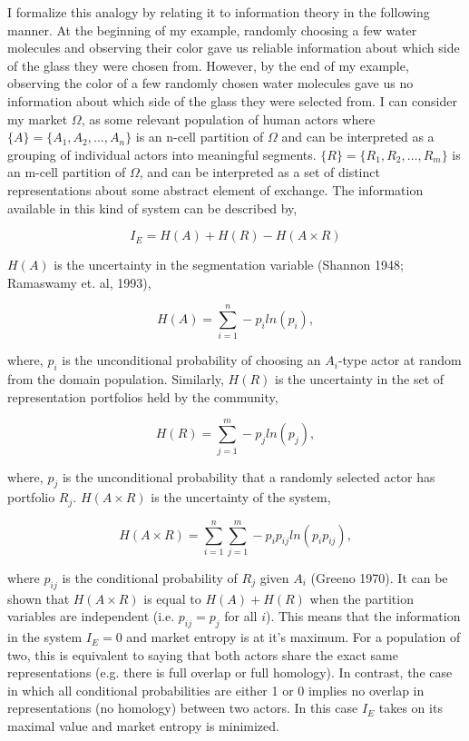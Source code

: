 I formalize this analogy by relating it to information theory in the following manner. At the beginning of my example, randomly choosing a few water molecules and observing their color gave us reliable information about which side of the glass they were chosen from. However, by the end of my example, observing the color of a few randomly chosen water molecules gave us no information about which side of the glass they were selected from.  I can consider my market $\Omega$, as some relevant population of human actors where $\{A\} = \{A_1, A_2,\ldots,A_n\}$ is an n-cell partition of $\Omega$ and can be interpreted as a grouping of individual actors into meaningful segments. $\{R\} = \{R_1, R_2,\ldots,R_m\}$ is an m-cell partition of $\Omega$, and can be interpreted as a set of distinct representations about some abstract element of exchange.  The information available in this kind of system can be described by,

\begin{equation}
I_E = H(A)+H(R)-H(A \times R)
\end{equation}

$H(A)$ is the uncertainty in the segmentation variable (Shannon 1948; Ramaswamy et. al, 1993), 

\begin{equation}
\nonumber H(A) = \sum_{i=1}^n -p_i ln(p_i),
\end{equation}

\noindent where, $p_i$ is the unconditional probability of choosing an $A_i$-type actor at random from the domain population. Similarly, $H(R)$ is the uncertainty in the set of representation portfolios held by the community,

\begin{equation}
\nonumber H(R) = \sum_{j=1}^m -p_j ln(p_j),
\end{equation}

\noindent where, $p_j$ is the unconditional probability that a randomly selected actor has portfolio $R_j$. $H(A \times R)$ is the uncertainty of the system,

\begin{equation}
\nonumber H(A \times R) = \sum_{i=1}^n\sum_{j=1}^m -p_ip_{ij}ln(p_ip_{ij}),
\end{equation}

\noindent where $p_{ij}$ is the conditional probability of $R_j$ given $A_i$ (Greeno 1970). It can be shown that $H(A \times R)$ is equal to $H(A) + H(R)$ when the partition variables are independent (i.e. $p_{ij} = p_j$ for all $i$). This means that the information in the system $I_E = 0$ and market entropy is at it's maximum. For a population of two, this is equivalent to saying that both actors share the exact same representations (e.g. there is full overlap or full homology). In contrast, the case in which all conditional probabilities are either 1 or 0 implies no overlap in representations (no homology) between two actors. In this case $I_E$ takes on its maximal value and market entropy is minimized.
 
